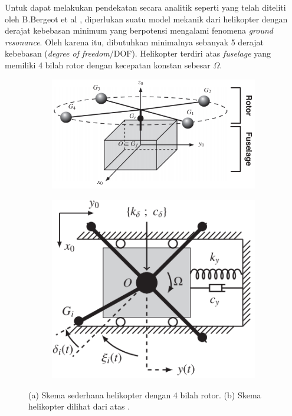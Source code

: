 Untuk dapat melakukan pendekatan secara analitik seperti yang telah diteliti oleh B.Bergeot et al \cite{BERGEOT201672}, diperlukan suatu model mekanik dari helikopter dengan derajat kebebasan minimum yang berpotensi mengalami fenomena \textit{ground resonance}. Oleh karena itu, dibutuhkan minimalnya sebanyak 5 derajat kebebasan (\textit{degree of freedom}/DOF). Helikopter terdiri atas \textit{fuselage} yang memiliki 4 bilah rotor dengan kecepatan konstan sebesar $\Omega$.

\begin{figure}[H]
	\centering 
	\begin{subfigure}{0.5\textwidth}
		\centering
		\includegraphics[width=\linewidth]{gambar/rotor_fuselage.png}
		\caption{}
		\label{fig:rotorfuselage}
	\end{subfigure}
	\centering
	\begin{subfigure}{0.4\textwidth}
		\centering
		\includegraphics[width=\linewidth]{gambar/rotor_fuselage_topview.png}
		\caption{}
		\label{fig:topviewrotorfuslage}
	\end{subfigure}
	\caption{(a) Skema sederhana helikopter dengan 4 bilah rotor. (b) Skema helikopter dilihat dari atas \cite{BERGEOT201672}.}
	\label{fig:simplifiedmodel}
\end{figure}

